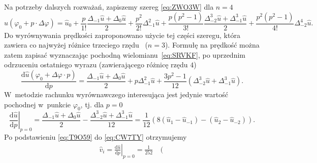 \documentclass[paper=a4,DIV=12]{tmmlab}
\newcommand{\od}[2]{\frac{\mathrm{d}#1}{\mathrm{d}#2}}
\begin{document}
\begin{appendices}
  Na potrzeby dalszych rozważań, zapiszemy szereg \eqref{eq:ZWO3W} dla $n=4$
  \begin{equation}
    \hat{u}(\varphi_0 + p \cdot \Delta\varphi) = \hat{u}_0
      + \frac{p}{1!}
        \frac{\Delta_{-1}\hat{u}+\Delta_0\hat{u}}{2}
      + \frac{p^2}{2!}
        \Delta_{-1}^2\hat{u}
      + \frac{p (p^2-1)}{3!}
        \frac{\Delta_{-2}^3\hat{u} + \Delta_{-1}^3\hat{u}}{2}
      + \frac{p^2 (p^2-1)}{4!}
        \Delta_{-2}^4\hat{u}.
    \label{eq:SRVKF}
  \end{equation}
  Do wyrównywania prędkości zaproponowano użycie tej części szeregu, która
  zawiera co najwyżej różnice trzeciego rzędu~\cite{oderfeld:1958:opewnym}
  ($n=3$). Formułę na prędkość można zatem zapisać wyznaczając pochodną
  wielomianu~\eqref{eq:SRVKF}, po uprzednim odrzuceniu ostatniego wyrazu
  (zawierającego różnicę rzędu $4$)
  \begin{equation}
    \od{\hat{u}(\varphi_0 + \Delta\varphi \cdot p)}{p}
      = \frac{\Delta_{-1}\hat{u}+\Delta_{0}\hat{u}}{2}
      + p \Delta_{-1}^2 \hat{u}
      + \frac{3 p^2 -1}{12}\left(\Delta_{-2}^3\hat{u} + \Delta_{-1}^3\hat{u}\right).
    \label{eq:K5OEP}
  \end{equation}
  W~metodzie rachunku wyrównawczego interesująca jest jedynie wartość pochodnej
  w~punkcie $\varphi_0$, tj. dla $p = 0$
  \begin{equation}
    \left.\od{\hat{u}}{p}\right|_{p=0}
      = \frac{\Delta_{-1}\hat{u} + \Delta_{0}\hat{u}}{2}
      - \frac{\Delta_{-2}^3\hat{u} + \Delta_{-1}^3\hat{u}}{12}
      = \frac{1}{12}\left(8 \left(\hat{u}_1 - \hat{u}_{-1}\right)
                          - \left(\hat{u}_2 - \hat{u}_{-2}\right)\right).
    \label{eq:CW7TY}
  \end{equation}
  Po podstawieniu \eqref{eq:T9O59} do \eqref{eq:CW7TY} otrzymujemy
  \begin{equation}
    \begin{aligned}
      \hat{v}_i = \left.\od{\hat{u}}{p}\right|_{p=0}
    = \frac{1}{252} & \left(

\end{aligned}
\end{equation}
\end{appendices}
\end{document}
